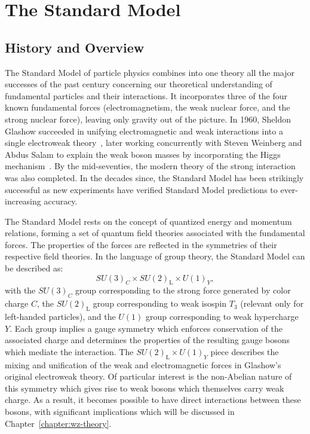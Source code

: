 \chapter{The Standard Model}
\label{chapter:standard-model}


\section{History and Overview}

The Standard Model of particle physics combines into one theory all the major successes of the past century concerning our theoretical understanding of fundamental particles and their interactions.  It incorporates three of the four known fundamental forces (electromagnetism, the weak nuclear force, and the strong nuclear force), leaving only gravity out of the picture.  In 1960, Sheldon Glashow succeeded in unifying electromagnetic and weak interactions into a single electroweak theory~\cite{Weinberg:1967tq}, later working concurrently with Steven Weinberg and Abdus Salam to explain the weak boson masses by incorporating the Higgs mechanism~\cite{PhysRevLett.13.508,PhysRevLett.13.321,PhysRevLett.13.585}.  By the mid-seventies, the modern theory of the strong interaction was also completed.  In the decades since, the Standard Model has been strikingly successful as new experiments have verified Standard Model predictions to ever-increasing accuracy.

The Standard Model rests on the concept of quantized energy and momentum relations, forming a set of quantum field theories associated with the fundamental forces.  The properties of the forces are reflected in the symmetries of their respective field theories.  In the language of group theory, the Standard Model can be described as:
\begin{equation}
  SU(3)_C \times SU(2)_\text{L} \times U(1)_Y,
\end{equation}
with the $SU(3)_C$ group corresponding to the strong force generated by color charge $C$, the $SU(2)_\text{L}$ group corresponding to weak isospin $T_3$ (relevant only for left-handed particles), and the $U(1)$ group corresponding to weak hypercharge $Y$.  Each group implies a gauge symmetry which enforces conservation of the associated charge and determines the properties of the resulting gauge bosons which mediate the interaction.  The $SU(2)_\text{L} \times U(1)_Y$ piece describes the mixing and unification of the weak and electromagnetic forces in Glashow's original electroweak theory.  Of particular interest is the non-Abelian nature of this symmetry which gives rise to weak bosons which themselves carry weak charge.  As a result, it becomes possible to have direct interactions between these bosons, with significant implications which will be discussed in Chapter~\ref{chapter:wz-theory}.


